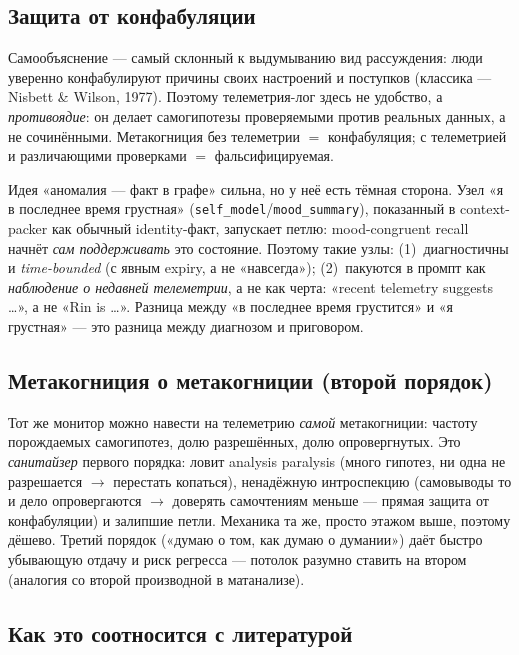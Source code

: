 \subsection*{Защита от конфабуляции}

Самообъяснение — самый склонный к выдумыванию вид рассуждения: люди уверенно
конфабулируют причины своих настроений и поступков (классика — Nisbett \& Wilson,
1977). Поэтому телеметрия-лог здесь не удобство, а \emph{противоядие}: он делает
самогипотезы проверяемыми против реальных данных, а не сочинёнными. Метакогниция без
телеметрии $=$ конфабуляция; с телеметрией и различающими проверками $=$
фальсифицируемая.

\begin{pitfall}
Идея «аномалия — факт в графе» сильна, но у неё есть тёмная сторона. Узел «я в
последнее время грустная» (\texttt{self\_model}/\texttt{mood\_summary}), показанный в
context-packer как обычный identity-факт, запускает петлю: mood-congruent recall
начнёт \emph{сам поддерживать} это состояние. Поэтому такие узлы: (1)~диагностичны и
\emph{time-bounded} (с явным expiry, а не «навсегда»); (2)~пакуются в промпт как
\emph{наблюдение о недавней телеметрии}, а не как черта: «recent telemetry suggests
\ldots», а не «Rin is \ldots». Разница между «в последнее время грустится» и «я
грустная» — это разница между диагнозом и приговором.
\end{pitfall}

\subsection*{Метакогниция о метакогниции (второй порядок)}

Тот же монитор можно навести на телеметрию \emph{самой} метакогниции: частоту
порождаемых самогипотез, долю разрешённых, долю опровергнутых. Это \emph{санитайзер}
первого порядка: ловит analysis paralysis (много гипотез, ни одна не разрешается
$\to$ перестать копаться), ненадёжную интроспекцию (самовыводы то и дело
опровергаются $\to$ доверять самочтениям меньше — прямая защита от конфабуляции) и
залипшие петли. Механика та же, просто этажом выше, поэтому дёшево. Третий порядок
(«думаю о том, как думаю о думании») даёт быстро убывающую отдачу и риск регресса —
потолок разумно ставить на втором (аналогия со второй производной в матанализе).

\subsection*{Как это соотносится с литературой}

